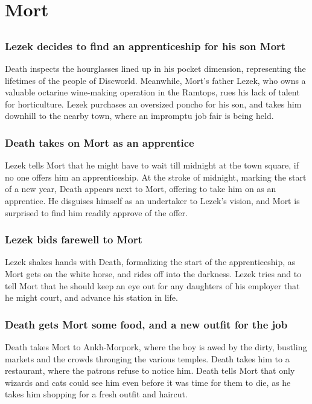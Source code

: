 \section{Mort}


\subsection{}
\subsubsection{\Gls{Lezek} decides to find an apprenticeship for his son \Gls{Mort}}
\Gls{Death} inspects the hourglasses lined up in his pocket dimension, representing the lifetimes
of the people of Discworld. Meanwhile, \Gls{Mort}'s father \Gls{Lezek}, who owns a valuable
octarine wine-making operation in the Ramtops, rues his lack of talent for horticulture. \Gls{Lezek}
purchases an oversized poncho for his son, and takes him downhill to the nearby town, where an
impromptu job fair is being held.

\subsubsection{\Gls{Death} takes on \Gls{Mort} as an apprentice}
\Gls{Lezek} tells \Gls{Mort} that he might have to wait till midnight at the town square, if no one
offers him an apprenticeship. At the stroke of midnight, marking the start of a new year,
\Gls{Death} appears next to \Gls{Mort}, offering to take him on as an apprentice. He disguises
himself as an undertaker to \Gls{Lezek}'s vision, and \Gls{Mort} is surprised to find him readily
approve of the offer.

\subsubsection{\Gls{Lezek} bids farewell to \Gls{Mort}}
\Gls{Lezek} shakes hands with \Gls{Death}, formalizing the start of the apprenticeship, as
\Gls{Mort} gets on the white horse, and rides off into the darkness. \Gls{Lezek} tries and to tell
\Gls{Mort} that he should keep an eye out for any daughters of his employer that he might court, and
advance his station in life.

\subsubsection{\Gls{Death} gets \Gls{Mort} some food, and a new outfit for the job}
\Gls{Death} takes \Gls{Mort} to Ankh-Morpork, where the boy is awed by the dirty, bustling markets
and the crowds thronging the various temples. \Gls{Death} takes him to a restaurant, where the
patrons refuse to notice him. \Gls{Death} tells \Gls{Mort} that only wizards and cats could see him
even before it was time for them to die, as he takes him shopping for a fresh outfit and haircut.

